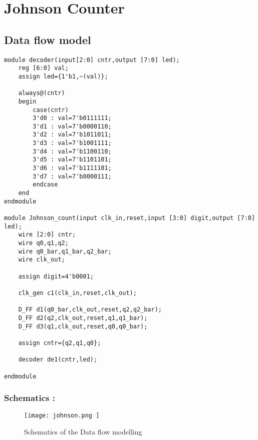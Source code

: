 \section*{Johnson Counter}

\subsection*{Data flow model}
\begin{verbatim}
module decoder(input[2:0] cntr,output [7:0] led);
	reg [6:0] val;
	assign led={1'b1,~(val)};
	
	always@(cntr)
	begin
		case(cntr)
		3'd0 : val=7'b0111111;
		3'd1 : val=7'b0000110;
		3'd2 : val=7'b1011011;
		3'd3 : val=7'b1001111;
		3'd4 : val=7'b1100110;
		3'd5 : val=7'b1101101;
		3'd6 : val=7'b1111101;
		3'd7 : val=7'b0000111;
		endcase
	end
endmodule

module Johnson_count(input clk_in,reset,input [3:0] digit,output [7:0] led);
	wire [2:0] cntr;
	wire q0,q1,q2;
	wire q0_bar,q1_bar,q2_bar;
	wire clk_out;
	
	assign digit=4'b0001;
	
	clk_gen c1(clk_in,reset,clk_out);
	
	D_FF d1(q0_bar,clk_out,reset,q2,q2_bar);
	D_FF d2(q2,clk_out,reset,q1,q1_bar);
	D_FF d3(q1,clk_out,reset,q0,q0_bar);
	
	assign cntr={q2,q1,q0};
	
	decoder de1(cntr,led);

endmodule
\end{verbatim}
\subsubsection*{Schematics : }
\begin{figure}[H]
    \centering
    \texttt{[image: 
		johnson.png
	]}
    \caption{Schematics of the Data flow modelling}
\end{figure}

